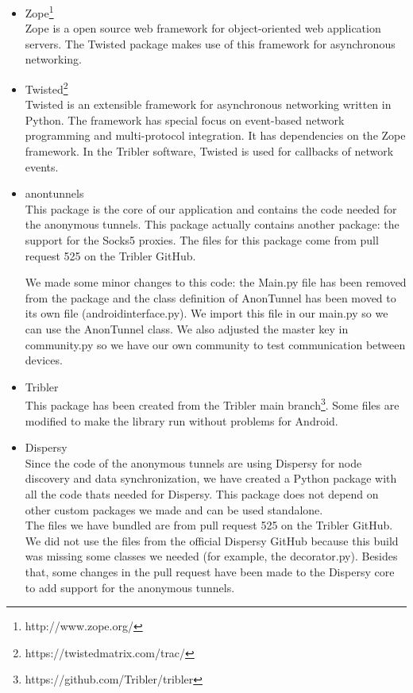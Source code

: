 \begin{itemize}
			\item Zope\footnote{http://www.zope.org/}\\
			Zope is a open source web framework for object-oriented web application servers. The Twisted package makes use of this framework for asynchronous networking.
		
			\item Twisted\footnote{https://twistedmatrix.com/trac/}\\
			Twisted is an extensible framework for asynchronous networking written in Python. The framework has special focus on event-based network programming and multi-protocol integration. It has dependencies on the Zope framework. In the Tribler software, Twisted is used for callbacks of network events.
		
			\item anontunnels\\
			This package is the core of our application and contains the code needed for the anonymous tunnels. This package actually contains another package: the support for the Socks5 proxies. The files for this package come from pull request 525 on the Tribler GitHub.
			
			We made some minor changes to this code: the Main.py file has been removed from the package and the class definition of AnonTunnel has been moved to its own file (androidinterface.py). We import this file in our main.py so we can use the AnonTunnel class. We also adjusted the master key in community.py so we have our own community to test communication between devices.
			
			\item Tribler\\
			This package has been created from the Tribler main branch\footnote{https://github.com/Tribler/tribler}. Some files are modified to make the library run without problems for Android.
			
			\item Dispersy\\
			Since the code of the anonymous tunnels are using Dispersy for node discovery and data synchronization, we have created a Python package with all the code thats needed for Dispersy. This package does not depend on other custom packages we made and can be used standalone.\\
			The files we have bundled are from pull request 525 on the Tribler GitHub. We did not use the files from the official Dispersy GitHub because this build was missing some classes we needed (for example, the decorator.py). Besides that, some changes in the pull request have been made to the Dispersy core to add support for the anonymous tunnels.
		
		\end{itemize}
	

